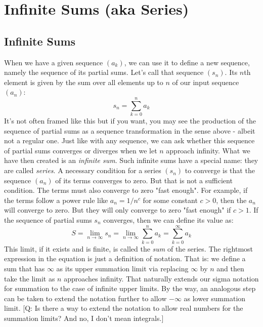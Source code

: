 \section{Infinite Sums (aka Series)}

\subsection{Infinite Sums}
When we have a given sequence $(a_k)$, we can use it to define a new sequence, namely the sequence of its partial sums. Let's call that sequence $(s_n)$. Its $n$th element is given by the sum over all elements up to $n$ of our input sequence $(a_n)$:
\begin{equation}
 s_n = \sum_{k=0}^n a_k
\end{equation}
It's not often framed like this but if you want, you may see the production of the sequence of partial sums as a sequence transformation in the sense above - albeit not a regular one. Just like with any sequence, we can ask whether this sequence of partial sums converges or diverges when we let $n$ approach infinity. What we have then created is an \emph{infinite sum}. Such infinite sums have a special name: they are called \emph{series}. A necessary condition for a series $(s_n)$ to converge is that the sequence $(a_n)$ of its terms converges to zero. But that is not a sufficient condition. The terms must also converge to zero "fast enough". For example, if the terms follow a power rule like $a_n = 1 / n^c$ for some constant $c > 0$, then the $a_n$ will converge to zero. But they will only converge to zero "fast enough" if $c > 1$. If the sequence of partial sums $s_n$ converges, then we can define its value as:
\begin{equation}
\label{Eq:InfiniteSum}
S = \lim_{n \rightarrow \infty} s_n 
  = \lim_{n \rightarrow \infty} \sum_{k=0}^n a_k
  = \sum_{k=0}^{\infty} a_k
\end{equation}
This limit, if it exists and is finite, is called the \emph{sum} of the series. The rightmost expression in the equation is just a definition of notation. That is: we define a sum that has $\infty$ as its upper summation limit via replacing $\infty$ by $n$ and then take the limit as $n$ approaches infinity. That naturally extends our sigma notation for summation to the case of infinite upper limits. By the way, an analogous step can be taken to extend the notation further to allow $-\infty$ as lower summation limit. [Q: Is there a way to extend the notation to allow real numbers for the summation limits? And no, I don't mean integrals.]

